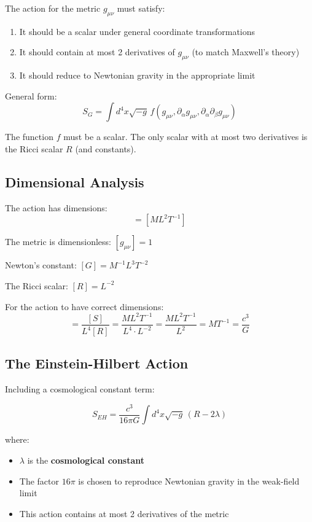 \documentclass[11pt,a4paper]{article}
\begin{document}
The action for the metric $g_{\mu\nu}$ must satisfy:

\begin{enumerate}
\item It should be a scalar under general coordinate transformations
\item It should contain at most 2 derivatives of $g_{\mu\nu}$ (to match Maxwell's theory)
\item It should reduce to Newtonian gravity in the appropriate limit
\end{enumerate}

General form:
\begin{equation}
S_G = \int d^4x \sqrt{-g} \, f(g_{\mu\nu}, \partial_\alpha g_{\mu\nu}, \partial_\alpha\partial_\beta g_{\mu\nu})
\end{equation}

The function $f$ must be a scalar. The only scalar with at most two derivatives is the Ricci scalar $R$ (and constants).

\subsection{Dimensional Analysis}

The action has dimensions:
\begin{equation}
[S] = [ML^2T^{-1}]
\end{equation}

The metric is dimensionless: $[g_{\mu\nu}] = 1$

Newton's constant: $[G] = M^{-1}L^3T^{-2}$

The Ricci scalar: $[R] = L^{-2}$

For the action to have correct dimensions:
\begin{equation}
[\alpha] = \frac{[S]}{L^4 [R]} = \frac{ML^2T^{-1}}{L^4 \cdot L^{-2}} = \frac{ML^2T^{-1}}{L^2} = MT^{-1} = \frac{c^3}{G}
\end{equation}

\subsection{The Einstein-Hilbert Action}

Including a cosmological constant term:

\begin{equation}
\boxed{S_{EH} = \frac{c^3}{16\pi G} \int d^4x \sqrt{-g} \, (R - 2\lambda)}
\end{equation}

where:
\begin{itemize}
\item $\lambda$ is the \textbf{cosmological constant}
\item The factor $16\pi$ is chosen to reproduce Newtonian gravity in the weak-field limit
\item This action contains at most 2 derivatives of the metric
\end{itemize}
\end{document}
